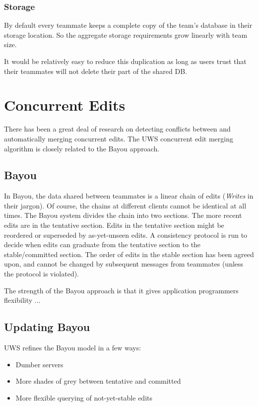 \documentclass{article}
\begin{document}
\subsubsection{Storage}

By default every teammate keeps a complete copy of the team's database in their storage location.
So the aggregate storage requirements grow linearly with team size.

It would be relatively easy to reduce this duplication as long as users trust that their teammates will not delete their part of the shared DB.

\section{Concurrent Edits}

There has been a great deal of research on detecting conflicts between and automatically merging concurrent edits.
The UWS concurrent edit merging algorithm is closely related to the Bayou approach.

\subsection{Bayou}

In Bayou, the data shared between teammates is a linear chain of edits (\emph{Writes} in their jargon).
Of course, the chains at different clients cannot be identical at all times.
The Bayou system divides the chain into two sections.
The more recent edits are in the tentative section.
Edits in the tentative section might be reordered or superseded by as-yet-unseen edits.
A consistency protocol is run to decide when edits can graduate from the tentative section to the stable/committed section.
The order of edits in the stable section has been agreed upon, and cannot be changed by subsequent messages from teammates (unless the protocol is violated).

The strength of the Bayou approach is that it gives application programmers flexibility ...

\subsection{Updating Bayou}

UWS refines the Bayou model in a few ways:

\begin{itemize}
\item Dumber servers
\item More shades of grey between tentative and committed
\item More flexible querying of not-yet-stable edits
\end{itemize}
\end{document}

